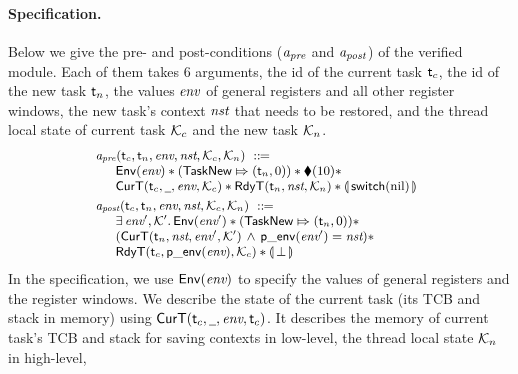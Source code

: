 \paragraph{\textbf{Specification.}}
Below we give the pre- and post-conditions
($\textit{a}_\textit{pre}$ and $\textit{a}_\textit{post}$) of the verified module.
Each of them takes 6 arguments, 
the id of the current task $\textsf{t}_c$, the id of the new 
task $\textsf{t}_n$, the values $\textit{env}$ of general registers and all
other register windows, the new task's context $\textit{nst}$
that needs to be restored, and the thread local state 
of current task $\mathcal{K}_c$ and the new task 
$\mathcal{K}_n$.  
\[
    \small
    \begin{array}{l}
        \textit{a}_\textit{pre}(\textsf{t}_c, \textsf{t}_n, \textit{env}, \textit{nst}, \mathcal{K}_c, \mathcal{K}_n)
        \ ::\!\!{=} \\
        \quad
        \begin{array}{l}
            \mathsf{Env}({\textit{env}}) *
            ({\mathsf{TaskNew}}\Mapsto{(\textsf{t}_n, 0)}) * 
            \blacklozenge({10}) * \\
            \textsf{CurT}({\textsf{t}_c}, {\underline{\ \,}}, {\textit{env}}, {\mathcal{K}_c}) * 
            \textsf{RdyT}({\textsf{t}_n}, {\textit{nst}}, {\mathcal{K}_n}) * 
            \llparenthesis {\, \mathsf{switch}(\text{nil}) \,} \rrparenthesis
        \end{array}
        \\
        \\[-8pt]
        \textit{a}_\textit{post}(\textsf{t}_c, \textsf{t}_n, \textit{env}, \textit{nst}, \mathcal{K}_c, \mathcal{K}_n)
        \ ::\!\!{=} \\ 
        \quad
        \begin{array}{l}
            \exists \, \textit{env}', \mathcal{K}'. \, \mathsf{Env}({\textit{env}'}) 
            * ({\mathsf{TaskNew}}\Mapsto{(\textsf{t}_n, 0)}) 
            * \
            \\
            (\textsf{CurT}({\textsf{t}_n}, {\textit{nst}}, {\textit{env}'}, {\mathcal{K}'})
            \,\land\,\mathsf{p\_env}({\textit{env}'}) = \textit{nst}) * 
            \\
            \textsf{RdyT}({\textsf{t}_c}, {\mathsf{p\_env}({\textit{env}})}, {\mathcal{K}_c}) * 
            \llparenthesis {\, \perp\,} \rrparenthesis
        \end{array}
    \end{array}
\]
In the specification,
we use $\mathsf{Env}({\textit{env}})$ to specify the values of
general registers and the register windows.
We describe the state
of the current task (its TCB and stack in memory)
using $\textsf{CurT}({\textsf{t}_c}, {\underline{\ \,}}, {\textit{env}}, {\textsf{t}_c})$. 
It describes the memory of current task's TCB 
and stack for saving contexts in low-level, 
the thread local state $\mathcal{K}_n$ in high-level, 
